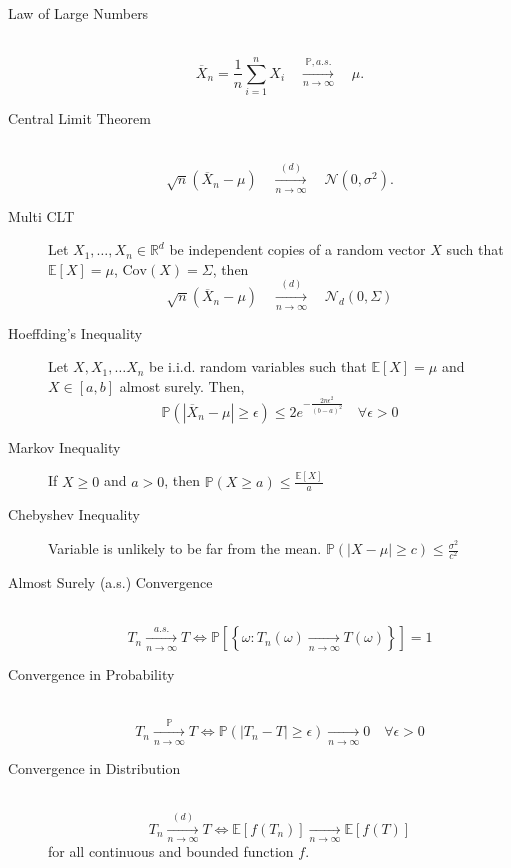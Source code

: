 \documentclass[a4paper, 10pt,landscape]{article}
\newcommand{\cov}{\textrm{Cov}}
\begin{document}
\begin{multicols*}{4}
\begin{description}
	\item[Law of Large Numbers] ~
	\begin{equation*}
	\overline{X}_n=\frac{1}{n}\sum_{i=1}^{n}X_i\quad\xrightarrow[n\rightarrow\infty]{\mathbb{P}, a.s.}\quad\mu.
	\end{equation*}
	\item[Central Limit Theorem] ~
	$$\sqrt{n}\left(\overline{X}_n-\mu\right)\quad\xrightarrow[n\rightarrow\infty]{(d)}\quad\mathcal{N}\left(0,\sigma^2\right).$$
	\item[Multi CLT]  Let $X_1,\dots,X_n\in\mathbb{R}^d$ be independent copies of a random vector $X$ such that $\mathbb{E}\left[X\right]=\mu$, $\cov\left(X\right)=\Sigma$, then
	$$\sqrt{n}\left(\overline{X}_n-\mu\right)\quad\xrightarrow[n\rightarrow\infty]{(d)}\quad\mathcal{N}_d\left(0,\Sigma\right)$$	
	\item[Hoeffding's Inequality] Let $X, X_1,\dots X_n$ be i.i.d. random variables such that $\mathbb{E}\left[X\right]=\mu$ and $X\in\left[a,b\right]$ almost surely. Then, \begin{equation*}
		\mathbb{P}\left(\left|\overline{X}_n-\mu\right|\geq\epsilon\right)\leq2e^{-\frac{2n\epsilon^2}{(b-a)^2}}\quad\forall\epsilon>0
	\end{equation*}
	\item[Markov Inequality] If $X \geq 0$ and $a > 0$, then $\mathbb{P} (X\geq a) \leq \frac{\mathbb{E}[X]}{a}$
	\item[Chebyshev Inequality] Variable is unlikely to be far from the mean. $\mathbb{P}(|X-\mu| \geq c) \leq \frac{\sigma^2}{c^2}$
\end{description}


\begin{description}
	\item[Almost Surely (a.s.) Convergence] ~
	\begin{equation*}
		T_n\xrightarrow[n\rightarrow\infty]{a.s.}T\iff\mathbb{P}\left[\left\{\omega:T_n(\omega)\xrightarrow[n\rightarrow\infty]{}T(\omega)\right\}\right]=1
	\end{equation*}
	\item[Convergence in Probability] ~
	\begin{equation*}
		T_n\xrightarrow[n\rightarrow\infty]{\mathbb{P}}T\iff\mathbb{P}\left(\left|T_n-T\right|\geq\epsilon\right)\xrightarrow[n\rightarrow\infty]{}0\quad\forall\epsilon>0
	\end{equation*}
	\item[Convergence in Distribution] ~
	\begin{equation*}
	T_n\xrightarrow[n\rightarrow\infty]{(d)}T\iff\mathbb{E}\left[f\left(T_n\right)\right]\xrightarrow[n\rightarrow\infty]{}\mathbb{E}\left[f\left(T\right)\right]
	\end{equation*}
	for all continuous and bounded function $f$.
\end{description}


\end{multicols*}
\end{document}

